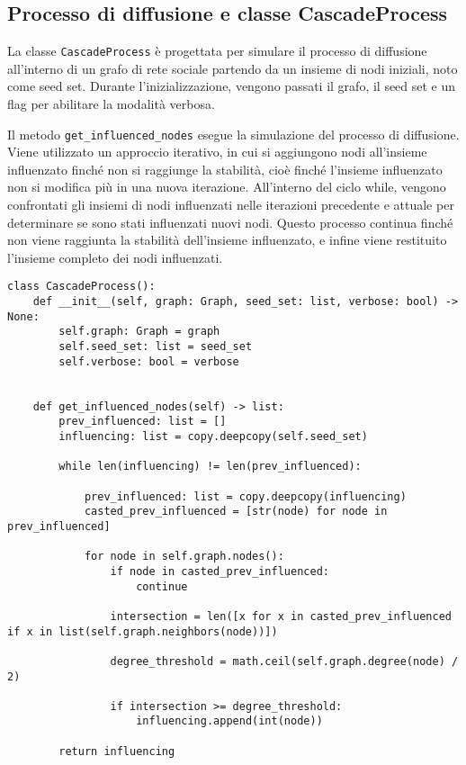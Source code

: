 \subsection{Processo di diffusione e classe CascadeProcess}

La classe \texttt{CascadeProcess} è progettata per simulare il processo di diffusione all'interno di un grafo di rete sociale partendo da un insieme di nodi iniziali, noto come seed set. Durante l'inizializzazione, vengono passati il grafo, il seed set e un flag per abilitare la modalità verbosa.

Il metodo \texttt{get_influenced_nodes} esegue la simulazione del processo di diffusione. Viene utilizzato un approccio iterativo, in cui si aggiungono nodi all'insieme influenzato finché non si raggiunge la stabilità, cioè finché l'insieme influenzato non si modifica più in una nuova iterazione. All'interno del ciclo while, vengono confrontati gli insiemi di nodi influenzati nelle iterazioni precedente e attuale per determinare se sono stati influenzati nuovi nodi. Questo processo continua finché non viene raggiunta la stabilità dell'insieme influenzato, e infine viene restituito l'insieme completo dei nodi influenzati. 

\begin{code}
\begin{verbatim}
class CascadeProcess():
    def __init__(self, graph: Graph, seed_set: list, verbose: bool) -> None:
        self.graph: Graph = graph
        self.seed_set: list = seed_set
        self.verbose: bool = verbose


    def get_influenced_nodes(self) -> list:
        prev_influenced: list = []
        influencing: list = copy.deepcopy(self.seed_set)
    
        while len(influencing) != len(prev_influenced):

            prev_influenced: list = copy.deepcopy(influencing)
            casted_prev_influenced = [str(node) for node in prev_influenced]

            for node in self.graph.nodes():
                if node in casted_prev_influenced:
                    continue

                intersection = len([x for x in casted_prev_influenced if x in list(self.graph.neighbors(node))])

                degree_threshold = math.ceil(self.graph.degree(node) / 2)

                if intersection >= degree_threshold:
                    influencing.append(int(node))
        
        return influencing
\end{verbatim}
\end{code}

